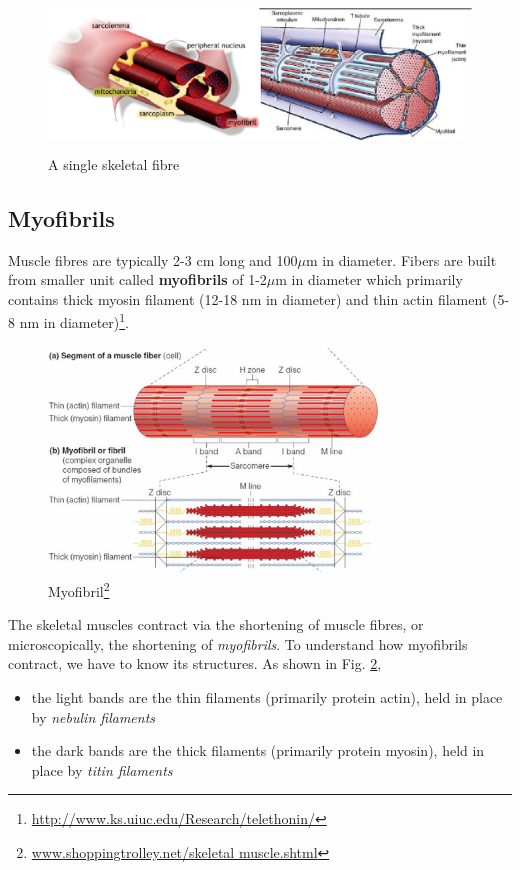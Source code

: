 \begin{figure}[hbt]
 \centerline{\includegraphics[height=4cm, angle=0]{./images/skeletal_fibre.eps}}
\caption{A single skeletal fibre}
\label{fig:skeletal_fibre}
\end{figure}


\subsection{Myofibrils}
\label{sec:myofibrils}

Muscle fibres are typically 2-3 cm long and 100$\mu$m in
diameter. Fibers are built from smaller unit called {\bf myofibrils}
of 1-2$\mu$m in diameter which primarily contains thick myosin
filament (12-18 nm in diameter) and thin actin filament (5-8 nm in
diameter)\footnote{\url{http://www.ks.uiuc.edu/Research/telethonin/}}.

\begin{figure}[hbt]
  \centerline{\includegraphics[height=6cm,
    angle=0]{./images/skeletal_muscle_fibre.eps}}
\caption{Myofibril\footnote{\url{www.shoppingtrolley.net/skeletal muscle.shtml}}}
\label{fig:skeletal_muscle_fibre}
\end{figure}

The skeletal muscles contract via the shortening of muscle fibres, or
microscopically, the shortening of {\it myofibrils}. To understand how
myofibrils contract, we have to know its structures. As shown in Fig.
\ref{fig:skeletal_muscle_fibre}, 
\begin{itemize}
\item the light bands are the thin filaments (primarily protein
  actin), held in place by {\it nebulin filaments}

\item the dark bands are the thick filaments (primarily protein
  myosin), held in place by {\it titin filaments}
\end{itemize}

